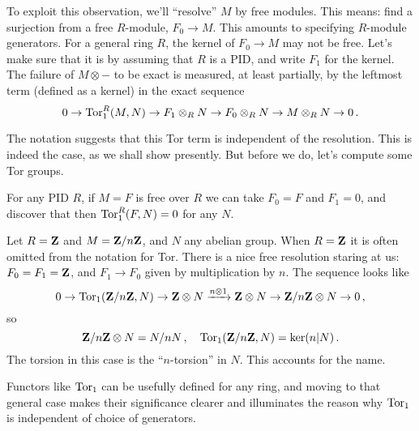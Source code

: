 To exploit this observation, we'll ``resolve'' $M$ by free modules. This means:
find a surjection from a free $R$-module, $F_0\to M$. This amounts to specifying $R$-module generators. For a general ring $R$, the kernel of $F_0\to M$ may
not be free. 
Let's make sure that it is by assuming that $R$ is a PID, and write $F_1$ for
the kernel. The failure of $M\otimes-$ to be exact is measured, at least
partially, by the leftmost term (defined as a kernel) in the exact sequence
\[
0\to\operatorname{Tor}_1^R(M,N)\to F_1\otimes_RN\to F_0\otimes_RN\to M\otimes_RN\to0\,.
\]

The notation suggests that this Tor term is independent of the resolution. 
This is indeed the case, as we shall show presently. But before we do, let's 
compute some Tor groups. 

\begin{example} 
For any PID $R$, if $M=F$ is free over $R$ we can take $F_0=F$
and $F_1=0$, and discover that then $\operatorname{Tor}_1^R(F,N)=0$ for any $N$. 
\end{example}
\begin{example} 
Let $R=\mathbf Z$ and $M=\mathbf Z/n\mathbf Z$, and $N$ any abelian group. When $R=\mathbf Z$ it is often
omitted from the notation for Tor.
There is a nice free resolution staring at us:
$F_0=F_1=\mathbf Z$, and $F_1\to F_0$ given by multiplication by $n$. The sequence
looks like 
\[
0\to\operatorname{Tor}_1(\mathbf Z/n\mathbf Z,N)\to\mathbf Z\otimes N\xrightarrow{n\otimes1}\mathbf Z\otimes N\to
\mathbf Z/n\mathbf Z\otimes N\to 0\,,
\]
so
\[
\mathbf Z/n\mathbf Z\otimes N=N/nN\,,\quad\operatorname{Tor}_1(\mathbf Z/n\mathbf Z,N)=\ker(n|N)\,.
\]
The torsion in this case is the ``$n$-torsion'' in $N$. This accounts for
the name.
\end{example}

Functors like $\operatorname{Tor}_1$ can be usefully defined for any ring, and moving to that
general case makes their significance clearer and illuminates the reason why 
$\operatorname{Tor}_1$ is independent of choice of generators. 

